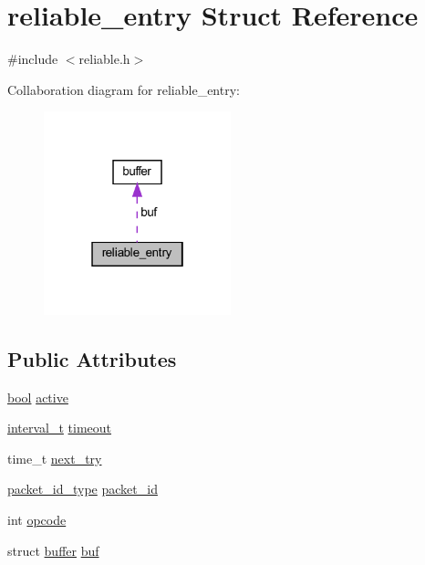 \hypertarget{structreliable__entry}{}\section{reliable\+\_\+entry Struct Reference}
\label{structreliable__entry}


{\ttfamily \#include $<$reliable.\+h$>$}



Collaboration diagram for reliable\+\_\+entry\+:
\nopagebreak
\begin{figure}[H]
\begin{center}
\leavevmode
\includegraphics[width=154pt]{structreliable__entry__coll__graph}
\end{center}
\end{figure}
\subsection*{Public Attributes}
\begin{DoxyCompactItemize}
\item 
\hyperlink{automatic_8c_abb452686968e48b67397da5f97445f5b}{bool} \hyperlink{structreliable__entry_ae7ed12ee1ab459520fd71aa86bb1484a}{active}
\item 
\hyperlink{common_8h_a3d8621f960ada51a5ad9ff181730481a}{interval\+\_\+t} \hyperlink{structreliable__entry_aec99769617a325b22d51865a668b14b7}{timeout}
\item 
time\+\_\+t \hyperlink{structreliable__entry_a6398a39696991060e2e80155cca8912b}{next\+\_\+try}
\item 
\hyperlink{packet__id_8h_a345f753b1c6ea20d24409e769aadb7e6}{packet\+\_\+id\+\_\+type} \hyperlink{structreliable__entry_a82e3388aade524471a76cd51a157d11e}{packet\+\_\+id}
\item 
int \hyperlink{structreliable__entry_a34e28012d3f858c2fc727e81fccedc09}{opcode}
\item 
struct \hyperlink{structbuffer}{buffer} \hyperlink{structreliable__entry_a0f522626659a560f3ca41cf46002887c}{buf}
\end{DoxyCompactItemize}


